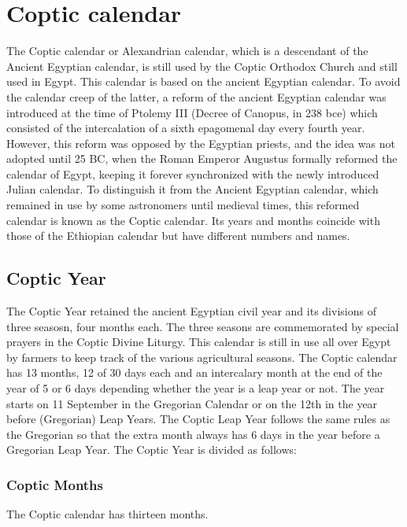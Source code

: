 \section{Coptic calendar}

The Coptic calendar or Alexandrian calendar, which is a descendant of the Ancient Egyptian calendar, is still used by the Coptic Orthodox Church and still used in Egypt.   This calendar is based on the ancient Egyptian calendar. To avoid the calendar creep of the latter, a reform of the ancient Egyptian calendar was introduced at the time of Ptolemy III (Decree of Canopus, in 238 bce) which consisted of the intercalation of a sixth epagomenal day every fourth year. However, this reform was opposed by the Egyptian priests, and the idea was not adopted until 25 BC, when the Roman Emperor Augustus formally reformed the calendar of Egypt, keeping it forever synchronized with the newly introduced Julian calendar. To distinguish it from the Ancient Egyptian calendar, which remained in use by some astronomers until medieval times, this reformed calendar is known as the Coptic calendar. Its years and months coincide with those of the Ethiopian calendar but have different numbers and names.

\subsection{Coptic Year}

The Coptic Year retained the ancient Egyptian civil year and its divisions of three seasosn, four months each.  The three seasons are commemorated by special prayers in the Coptic Divine Liturgy. This calendar is still in use all over Egypt by farmers to keep track of the various agricultural seasons. The Coptic calendar has 13 months, 12 of 30 days each and an intercalary month at the end of the year of 5 or 6 days depending whether the year is a leap year or not. The year starts on 11 September in the Gregorian Calendar or on the 12th in the year before (Gregorian) Leap Years. The Coptic Leap Year follows the same rules as the Gregorian so that the extra month always has 6 days in the year before a Gregorian Leap Year. The Coptic Year is divided as follows:


\subsubsection{Coptic Months}  The Coptic calendar has thirteen months. 

